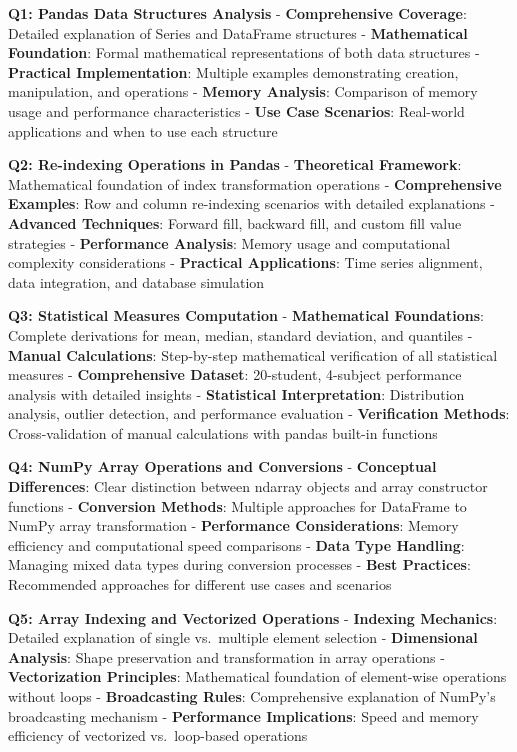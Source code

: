 \documentclass[11pt]{article}
\begin{document}
\textbf{Q1: Pandas Data Structures Analysis} - \textbf{Comprehensive
Coverage}: Detailed explanation of Series and DataFrame structures -
\textbf{Mathematical Foundation}: Formal mathematical representations of
both data structures - \textbf{Practical Implementation}: Multiple
examples demonstrating creation, manipulation, and operations -
\textbf{Memory Analysis}: Comparison of memory usage and performance
characteristics - \textbf{Use Case Scenarios}: Real-world applications
and when to use each structure

\textbf{Q2: Re-indexing Operations in Pandas} - \textbf{Theoretical
Framework}: Mathematical foundation of index transformation operations -
\textbf{Comprehensive Examples}: Row and column re-indexing scenarios
with detailed explanations - \textbf{Advanced Techniques}: Forward fill,
backward fill, and custom fill value strategies - \textbf{Performance
Analysis}: Memory usage and computational complexity considerations -
\textbf{Practical Applications}: Time series alignment, data
integration, and database simulation

\textbf{Q3: Statistical Measures Computation} - \textbf{Mathematical
Foundations}: Complete derivations for mean, median, standard deviation,
and quantiles - \textbf{Manual Calculations}: Step-by-step mathematical
verification of all statistical measures - \textbf{Comprehensive
Dataset}: 20-student, 4-subject performance analysis with detailed
insights - \textbf{Statistical Interpretation}: Distribution analysis,
outlier detection, and performance evaluation - \textbf{Verification
Methods}: Cross-validation of manual calculations with pandas built-in
functions

\textbf{Q4: NumPy Array Operations and Conversions} - \textbf{Conceptual
Differences}: Clear distinction between ndarray objects and array
constructor functions - \textbf{Conversion Methods}: Multiple approaches
for DataFrame to NumPy array transformation - \textbf{Performance
Considerations}: Memory efficiency and computational speed comparisons -
\textbf{Data Type Handling}: Managing mixed data types during conversion
processes - \textbf{Best Practices}: Recommended approaches for
different use cases and scenarios

\textbf{Q5: Array Indexing and Vectorized Operations} - \textbf{Indexing
Mechanics}: Detailed explanation of single vs.~multiple element
selection - \textbf{Dimensional Analysis}: Shape preservation and
transformation in array operations - \textbf{Vectorization Principles}:
Mathematical foundation of element-wise operations without loops -
\textbf{Broadcasting Rules}: Comprehensive explanation of NumPy's
broadcasting mechanism - \textbf{Performance Implications}: Speed and
memory efficiency of vectorized vs.~loop-based operations
\end{document}
